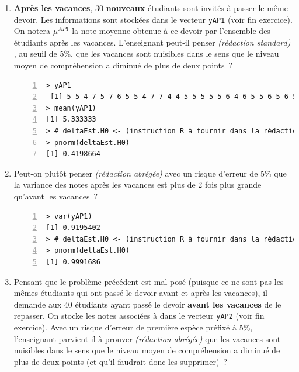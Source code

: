 \documentclass[10pt]{report}
\newcommand{\redabr}{\textit{(rédaction abrégée) }}
\newcommand{\redstd}{\textit{(rédaction standard) }}
\begin{document}
\begin{exercice}
\begin{enumerate}
 








\item  
\textbf{Après les vacances}, 30 \textbf{nouveaux} étudiants sont invités à passer le même devoir. Les informations sont stockées dans le vecteur \texttt{yAP1} (voir fin exercice). On notera $\mu^{AP1}$ la note moyenne obtenue à ce devoir par l'ensemble des étudiants après les vacances. L'enseignant peut-il penser \redstd, au seuil de 5\%, que les vacances sont nuisibles dans le sens que le niveau moyen de compréhension a diminué de plus de deux points~?

\IndicR
\begin{Verbatim}[frame=leftline,fontfamily=tt,fontshape=n,numbers=left]
> yAP1
 [1] 5 5 4 7 5 7 6 5 5 4 7 7 4 4 5 5 5 5 5 6 4 6 5 5 6 5 6 5 7 5
> mean(yAP1)
[1] 5.333333
> # deltaEst.H0 <- (instruction R à fournir dans la rédaction)
> pnorm(deltaEst.H0)
[1] 0.4198664
\end{Verbatim}

 






\item 
Peut-on plutôt penser \redabr avec un risque d'erreur de 5\% que la variance des notes après les vacances est plus de 2 fois plus grande qu'avant les vacances~?

\IndicR
\begin{Verbatim}[frame=leftline,fontfamily=tt,fontshape=n,numbers=left]
> var(yAP1)
[1] 0.9195402
> # deltaEst.H0 <- (instruction R à fournir dans la rédaction)
> pnorm(deltaEst.H0)
[1] 0.9991686
\end{Verbatim}

 








\item 
Pensant que le problème précédent est mal posé (puisque ce ne sont pas les mêmes étudiants qui ont passé le devoir avant et après les vacances), il demande aux 40 étudiants ayant passé le devoir \textbf{avant les vacances} de le repasser. On stocke les notes associ{\'e}es {\`a} dans le vecteur \texttt{yAP2} (voir fin exercice). Avec un risque d'erreur de premi{\`e}re esp{\`e}ce pr{\'e}fix{\'e} {\`a} 5\%, l'enseignant parvient-il à prouver \redabr que les vacances sont nuisibles dans le sens que le niveau moyen de compréhension a diminué de plus de deux points (et qu'il faudrait donc les supprimer)~?


\end{enumerate}
\end{exercice}
\end{document}
